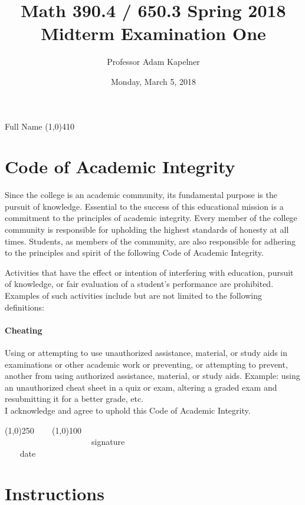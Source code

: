 \documentclass[12pt]{article}
\title{Math 390.4 / 650.3 Spring 2018 \\ Midterm Examination One}
\author{Professor Adam Kapelner}
\date{Monday, March 5, 2018}
\begin{document}
\maketitle

\noindent Full Name \line(1,0){410}

\thispagestyle{empty}

\section*{Code of Academic Integrity}

\footnotesize
Since the college is an academic community, its fundamental purpose is the pursuit of knowledge. Essential to the success of this educational mission is a commitment to the principles of academic integrity. Every member of the college community is responsible for upholding the highest standards of honesty at all times. Students, as members of the community, are also responsible for adhering to the principles and spirit of the following Code of Academic Integrity.

Activities that have the effect or intention of interfering with education, pursuit of knowledge, or fair evaluation of a student's performance are prohibited. Examples of such activities include but are not limited to the following definitions:

\paragraph{Cheating} Using or attempting to use unauthorized assistance, material, or study aids in examinations or other academic work or preventing, or attempting to prevent, another from using authorized assistance, material, or study aids. Example: using an unauthorized cheat sheet in a quiz or exam, altering a graded exam and resubmitting it for a better grade, etc.
\\

\noindent I acknowledge and agree to uphold this Code of Academic Integrity. \\

\begin{center}
\line(1,0){250} ~~~ \line(1,0){100}\\
~~~~~~~~~~~~~~~~~~~~~signature~~~~~~~~~~~~~~~~~~~~~~~~~~~~~~~~~~~~~~~~~~~~~ date
\end{center}

\normalsize

\section*{Instructions}
\end{document}

